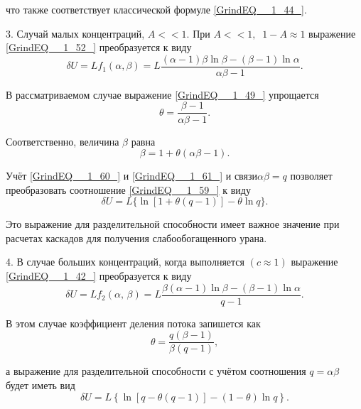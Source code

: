 что также соответствует классической формуле \ref{GrindEQ__1_44_}.

3. Случай малых концентраций, $A<<1.$ При $A<<1,\; \; 1-A\approx 1$ выражение \ref{GrindEQ__1_52_} преобразуется к виду
\begin{equation} \label{GrindEQ__1_59_} 
\delta U=Lf_{1} (\alpha ,\beta )=L\frac{(\alpha -1)\beta \ln \beta -(\beta -1)\ln \alpha }{\alpha \beta -1} .                     
\end{equation} 

В рассматриваемом случае выражение \ref{GrindEQ__1_49_} упрощается
\begin{equation} \label{GrindEQ__1_60_} 
\theta =\frac{\beta -1}{\alpha \beta -1} .                                        
\end{equation} 

Соответственно, величина $\beta $ равна
\begin{equation} \label{GrindEQ__1_61_} 
\beta =1+\theta (\alpha \beta -1).                            
\end{equation} 

Учёт \ref{GrindEQ__1_60_} и \ref{GrindEQ__1_61_} и связи$\alpha \beta =q$ позволяет преобразовать соотношение \ref{GrindEQ__1_59_} к виду
\begin{equation} \label{GrindEQ__1_62_} 
\delta U=L\{ \ln [1+\theta (q-1)]-\theta \ln q\} .            
\end{equation} 

Это выражение для разделительной способности имеет важное значение при расчетах каскадов для получения слабообогащенного урана. 

4. В случае больших концентраций, когда выполняется $(c\approx 1)$ выражение \ref{GrindEQ__1_42_} преобразуется к виду
\begin{equation} \label{GrindEQ__1_63_} 
\delta U=Lf_{2} (\alpha ,\, \beta )=L\frac{\beta (\alpha -1)\ln \beta -(\beta -1)\ln \alpha }{q-1} .     
\end{equation} 

В этом случае коэффициент деления потока запишется как
\begin{equation} \label{GrindEQ__1_64_} 
\theta =\frac{q(\beta -1)}{\beta (q-1)} ,         
\end{equation} 

а выражение для разделительной способности с учётом соотношения $q=\alpha \beta $ будет иметь вид
\begin{equation} \label{GrindEQ__1_65_} 
\delta U=L\left\{\ln \left[q-\theta (q-1)\right]-(1-\theta )\ln q\right\}.      
\end{equation} 

